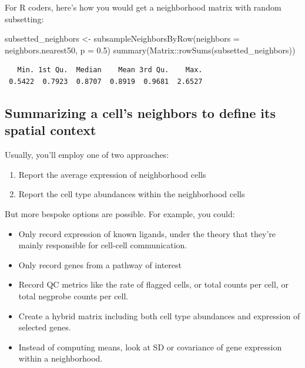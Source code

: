 \documentclass[
  letterpaper,
  DIV=11,
  numbers=noendperiod]{scrartcl}
\newenvironment{Shaded}{\begin{snugshade}}{\end{snugshade}}
\newcommand{\AttributeTok}[1]{\textcolor[rgb]{0.40,0.45,0.13}{#1}}
\newcommand{\FloatTok}[1]{\textcolor[rgb]{0.68,0.00,0.00}{#1}}
\newcommand{\FunctionTok}[1]{\textcolor[rgb]{0.28,0.35,0.67}{#1}}
\newcommand{\NormalTok}[1]{\textcolor[rgb]{0.00,0.23,0.31}{#1}}
\newcommand{\OtherTok}[1]{\textcolor[rgb]{0.00,0.23,0.31}{#1}}
\newcommand{\SpecialCharTok}[1]{\textcolor[rgb]{0.37,0.37,0.37}{#1}}
\providecommand{\tightlist}{%
  \setlength{\itemsep}{0pt}\setlength{\parskip}{0pt}}\usepackage{longtable,booktabs,array}
\begin{document}
For R coders, here's how you would get a neighborhood matrix with random
subsetting:

\begin{Shaded}
\begin{Highlighting}[]
\NormalTok{subsetted\_neighbors }\OtherTok{\textless{}{-}} \FunctionTok{subsampleNeighborsByRow}\NormalTok{(}\AttributeTok{neighbors =}\NormalTok{ neighbors.nearest50, }\AttributeTok{p =} \FloatTok{0.5}\NormalTok{)}
\FunctionTok{summary}\NormalTok{(Matrix}\SpecialCharTok{::}\FunctionTok{rowSums}\NormalTok{(subsetted\_neighbors))}
\end{Highlighting}
\end{Shaded}

\begin{verbatim}
   Min. 1st Qu.  Median    Mean 3rd Qu.    Max. 
 0.5422  0.7923  0.8707  0.8919  0.9681  2.6527 
\end{verbatim}

\hypertarget{summarizing-a-cells-neighbors-to-define-its-spatial-context}{%
\subsection{Summarizing a cell's neighbors to define its spatial
context}\label{summarizing-a-cells-neighbors-to-define-its-spatial-context}}

Usually, you'll employ one of two approaches:

\begin{enumerate}
\def\labelenumi{\arabic{enumi}.}
\tightlist
\item
  Report the average expression of neighborhood cells
\item
  Report the cell type abundances within the neighborhood cells
\end{enumerate}

But more bespoke options are possible. For example, you could:

\begin{itemize}
\tightlist
\item
  Only record expression of known ligands, under the theory that they're
  mainly responsible for cell-cell communication.
\item
  Only record genes from a pathway of interest
\item
  Record QC metrics like the rate of flagged cells, or total counts per
  cell, or total negprobe counts per cell.
\item
  Create a hybrid matrix including both cell type abundances and
  expression of selected genes.
\item
  Instead of computing means, look at SD or covariance of gene
  expression within a neighborhood.
\end{itemize}
\end{document}
